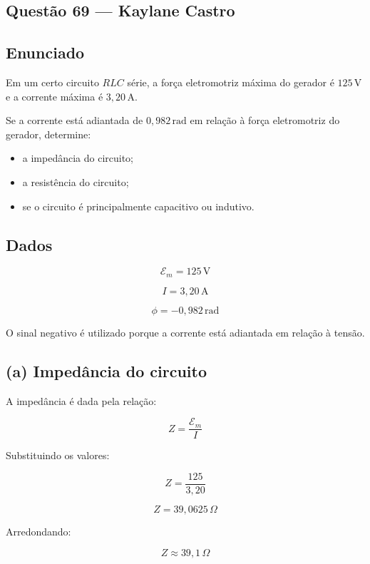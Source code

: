 \documentclass[12pt,a4paper]{article}
\begin{document}
\vspace{0.2cm}
\subsection{Questão 69 — Kaylane Castro}

\subsection*{Enunciado}

Em um certo circuito $RLC$ série, a força eletromotriz máxima
do gerador é $125\,\text{V}$ e a corrente máxima é
$3,20\,\text{A}$.

Se a corrente está adiantada de $0,982\,\text{rad}$ em relação
à força eletromotriz do gerador, determine:

\begin{itemize}
    \item[(a)] a impedância do circuito;
    \item[(b)] a resistência do circuito;
    \item[(c)] se o circuito é principalmente capacitivo ou indutivo.
\end{itemize}

\subsection*{Dados}

\[
\mathcal{E}_m = 125\,\text{V}
\]

\[
I = 3,20\,\text{A}
\]

\[
\phi = -0,982\,\text{rad}
\]

O sinal negativo é utilizado porque a corrente está adiantada em
relação à tensão.


\subsection*{(a) Impedância do circuito}

A impedância é dada pela relação:

\[
Z=\frac{\mathcal{E}_m}{I}
\]

Substituindo os valores:

\[
Z=\frac{125}{3,20}
\]

\[
Z=39,0625\,\Omega
\]

Arredondando:

\[
\boxed{Z\approx 39,1\,\Omega}
\]
\end{document}
